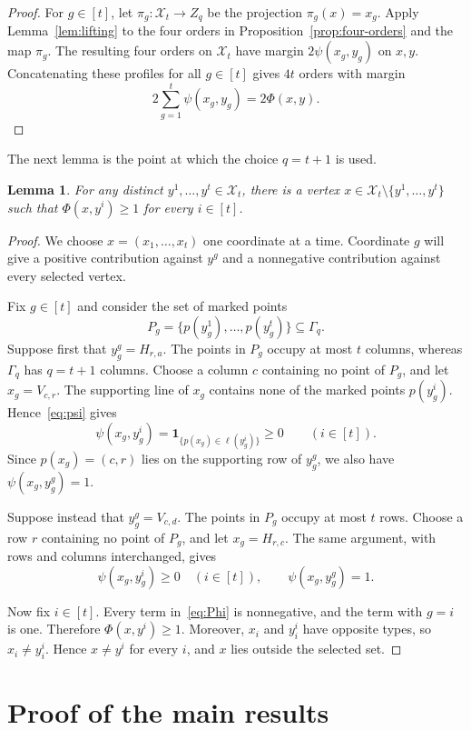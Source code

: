 \documentclass[12pt]{article}
\newtheorem{lemma}[theorem]{Lemma}
\theoremstyle{remark}
\newcommand{\one}{\mathbf{1}}
\newcommand{\cX}{\mathcal{X}}
\begin{document}
\begin{proof}
For $g\in[t]$, let $\pi_g:\cX_t\to Z_q$ be the projection
$\pi_g(x)=x_g$.  Apply Lemma~\ref{lem:lifting} to the four orders in
Proposition~\ref{prop:four-orders} and the map $\pi_g$.  The resulting
four orders on $\cX_t$ have margin $2\psi(x_g,y_g)$ on $x,y$.
Concatenating these profiles for all $g\in[t]$ gives $4t$ orders with
margin
\[
  2\sum_{g=1}^t\psi(x_g,y_g)=2\Phi(x,y).
\]
\end{proof}

The next lemma is the point at which the choice $q=t+1$ is used.

\begin{lemma}\label{lem:common-vertex}
For any distinct $y^1,\ldots,y^t\in\cX_t$, there is a vertex
$x\in\cX_t\setminus\{y^1,\ldots,y^t\}$ such that
$\Phi(x,y^i)\ge1$ for every $i\in[t]$.
\end{lemma}

\begin{proof}
We choose $x=(x_1,\ldots,x_t)$ one coordinate at a time.  Coordinate
$g$ will give a positive contribution against $y^g$ and a nonnegative
contribution against every selected vertex.

Fix $g\in[t]$ and consider the set of marked points
\[
  P_g=\{p(y^1_g),\ldots,p(y^t_g)\}\subseteq\Gamma_q.
\]
Suppose first that $y^g_g=H_{r,a}$.  The points in $P_g$ occupy at most
$t$ columns, whereas $\Gamma_q$ has $q=t+1$ columns.  Choose a column
$c$ containing no point of $P_g$, and let
$x_g=V_{c,r}$.
The supporting line of $x_g$ contains none of the marked points
$p(y^i_g)$.  Hence~\eqref{eq:psi} gives
\[
  \psi(x_g,y^i_g)=
  \one_{\{p(x_g)\in\ell(y^i_g)\}}\ge0
  \qquad (i\in[t]).
\]
Since $p(x_g)=(c,r)$ lies on the supporting row of $y^g_g$, we also
have $\psi(x_g,y^g_g)=1$.

Suppose instead that $y^g_g=V_{c,d}$.  The points in $P_g$ occupy at
most $t$ rows.  Choose a row $r$ containing no point of $P_g$, and let $x_g=H_{r,c}$.
The same argument, with rows and columns interchanged, gives
\[
  \psi(x_g,y^i_g)\ge0\quad(i\in[t]),
  \qquad
  \psi(x_g,y^g_g)=1.
\]

Now fix $i\in[t]$.  Every term in~\eqref{eq:Phi} is nonnegative, and
the term with $g=i$ is one.  Therefore $\Phi(x,y^i)\ge1$.  Moreover,
$x_i$ and $y^i_i$ have opposite types, so $x_i\ne y^i_i$.  Hence
$x\ne y^i$ for every $i$, and $x$ lies outside the selected set.
\end{proof}

\section{Proof of the main results}
\end{document}
